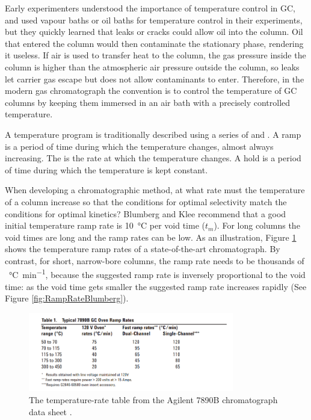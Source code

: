 Early experimenters understood the importance of temperature control in GC, and
used vapour baths \autocite{Desty1957} or oil baths \autocite{Eggertsen1956} for
temperature control in their experiments, but they quickly learned that leaks or
cracks could allow oil into the column. Oil that entered the column would then
contaminate the stationary phase, rendering it useless.  If air is used to
transfer heat to the column, the gas pressure inside the column is higher than
the atmospheric air pressure outside the column, so leaks let carrier gas escape
but does not allow contaminants to enter. Therefore, in the modern gas
chromatograph the convention is to control the temperature of GC columns by
keeping them immersed in an air bath with a precisely controlled temperature.

A temperature program is traditionally described using a series of
 and . A ramp is a period of time during which the
temperature changes, almost always increasing. The  is the
rate at which the temperature changes. A hold is a period of time during which
the temperature is kept constant.

When developing a chromatographic method, at what rate must the temperature of a
column increase so that the conditions for optimal selectivity match the
conditions for optimal kinetics? Blumberg and Klee \autocite{Blumberg2000}
recommend that a good initial temperature ramp rate is \SI{10}{\celsius} per
void time (\(t_m\)). For long columns the void times are long and the ramp
rates can be low. As an illustration, Figure \ref{fig:RampRate7890B} shows the
temperature ramp rates of a state-of-the-art chromatograph. By contrast, for
short, narrow-bore columns, the ramp rate needs to be thousands of
\SI{}{\celsius\per\minute}, because the suggested ramp rate is inversely
proportional to the void time: as the void time gets smaller the suggested ramp
rate increases rapidly (See Figure \ref{fig:RampRateBlumberg}).

\begin{figure}
	\centering
	\includegraphics[width=0.8\textwidth]{Figures/7890B.png}
	\decoRule
	\caption[A temperature-rate table from the Agilent7890B data sheet]{The
	temperature-rate table from the Agilent 7890B chromatograph data sheet
	\autocite{7890B}. }
	\label{fig:RampRate7890B}
\end{figure}


